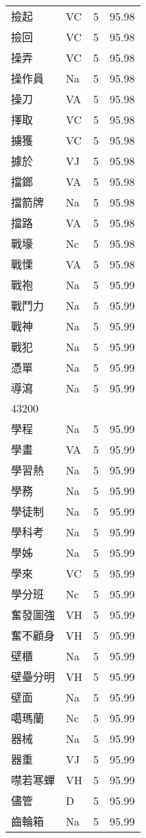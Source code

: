\documentclass[twocolumn]{book}
\begin{document}
\begin{supertabular}{llrr}
撿起 & VC & 5 &  95.98\\
撿回 & VC & 5 &  95.98\\
操弄 & VC & 5 &  95.98\\
操作員 & Na & 5 &  95.98\\
操刀 & VA & 5 &  95.98\\
擇取 & VC & 5 &  95.98\\
擄獲 & VC & 5 &  95.98\\
據於 & VJ & 5 &  95.98\\
擋鎯 & VA & 5 &  95.98\\
擋箭牌 & Na & 5 &  95.98\\
擋路 & VA & 5 &  95.98\\
戰壕 & Nc & 5 &  95.98\\
戰慄 & VA & 5 &  95.98\\
戰袍 & Na & 5 &  95.99\\
戰鬥力 & Na & 5 &  95.99\\
戰神 & Na & 5 &  95.99\\
戰犯 & Na & 5 &  95.99\\
憑單 & Na & 5 &  95.99\\
導瀉 & Na & 5 &  95.99\\
43200\\
學程 & Na & 5 &  95.99\\
學畫 & VA & 5 &  95.99\\
學習熱 & Na & 5 &  95.99\\
學務 & Na & 5 &  95.99\\
學徒制 & Na & 5 &  95.99\\
學科考 & Na & 5 &  95.99\\
學姊 & Na & 5 &  95.99\\
學來 & VC & 5 &  95.99\\
學分班 & Nc & 5 &  95.99\\
奮發圖強 & VH & 5 &  95.99\\
奮不顧身 & VH & 5 &  95.99\\
壁櫃 & Na & 5 &  95.99\\
壁壘分明 & VH & 5 &  95.99\\
壁面 & Na & 5 &  95.99\\
噶瑪蘭 & Nc & 5 &  95.99\\
器械 & Na & 5 &  95.99\\
器重 & VJ & 5 &  95.99\\
噤若寒蟬 & VH & 5 &  95.99\\
儘管 & D & 5 &  95.99\\
齒輪箱 & Na & 5 &  95.99\\

\end{supertabular}
\end{document}
